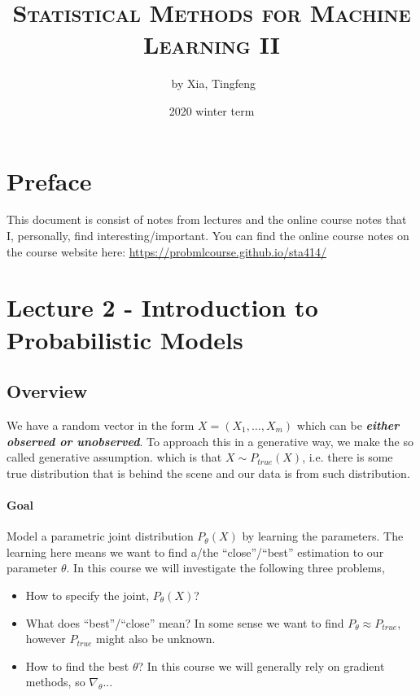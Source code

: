 \documentclass[11pt]{article}
\author{\ccLogo \,\,by Xia, Tingfeng}
\title{\textsc{Statistical Methods for Machine Learning II}}
\date{2020 winter term}
\begin{document}
\maketitle
\doclicenseThis
\section*{Preface} 
This document is consist of notes from lectures and the online course notes that I, personally, find interesting/important. You can find the online course notes on the course website here: \url{https://probmlcourse.github.io/sta414/}

\tableofcontents

\newpage

\section{Lecture 2 - Introduction to Probabilistic Models}
\subsection{Overview}
We have a random vector in the form $X = (X_1,\dots,X_m)$ which can be \textit{\textbf{either observed or unobserved}}. To approach this in a generative way, we make the so called generative assumption. which is that $X\sim P_{true}(X)$, i.e. there is some true distribution that is behind the scene and our data is from such distribution. 

\paragraph{Goal} Model a parametric joint distribution $P_\theta (X)$ by learning the parameters. The learning here means we want to find a/the ``close''/``best'' estimation to our parameter $\theta$. In this course we will investigate the following three problems,
\begin{itemize}
    \item How to specify the joint, $P_\theta(X)$?
    \item What does ``best''/``close'' mean? In some sense we want to find $P_\theta \approx P_{true}$, however $P_{true}$ might also be unknown.
    \item How to find the best $\theta$? In this course we will generally rely on gradient methods, so $\nabla_\theta$...
\end{itemize}
\end{document}
